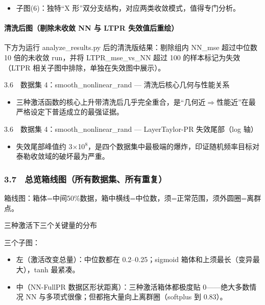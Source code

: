 \documentclass[UTF8,a4paper,11pt]{ctexart}
\begin{document}
\begin{itemize}
\item 子图(6)：独特“X 形”双分支结构，对应两类收敛模式，值得专门分析。
\end{itemize}

\paragraph{清洗后图（剔除未收敛 NN 与 LTPR 失效值后重绘）}

下方为运行 analyze\_results.py 后的清洗版结果：剔除组内 NN\_mse 超过中位数 10 倍的未收敛 run，并将 LTPR\_mse\_vs\_NN 超过 100 的样本标记为失效（LTPR 相关子图中排除，单独在失效图中展示）。

3.6　数据集 4：smooth\_nonlinear\_rand --- 清洗后核心几何与性能关系

\begin{itemize}
\item 三种激活函数的核心上升带清洗后几乎完全重合，是“几何近$\Rightarrow$性能近”在最严格设定下普适成立的最强证据。
\end{itemize}

3.6　数据集 4：smooth\_nonlinear\_rand --- LayerTaylor-PR 失效尾部（log 轴）

\begin{itemize}
\item 失效尾部峰值约 3$\times$10$^8$，是四个数据集中最极端的爆炸，印证随机频率目标对泰勒收敛域的破坏最为严重。
\end{itemize}

\subsubsection{3.7　总览箱线图（所有数据集、所有重复）}

箱线图：箱体=中间50\%数据，箱中横线=中位数，须=正常范围，须外圆圈=离群点。

三种激活下三个关键量的分布

三个子图：

\begin{itemize}
\item 左（激活改变总量）：中位数都在 0.2--0.25；sigmoid 箱体和上须最长（变异最大），tanh 最紧凑。
\end{itemize}

\begin{itemize}
\item 中（NN-FullPR 数据区形状距离）：三种激活箱体都极度贴 0------绝大多数情况 NN 与多项式很像；但都拖大量向上离群圈（softplus 到 0.83）。
\end{itemize}
\end{document}
